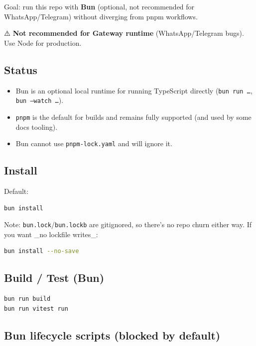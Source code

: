 Goal: run this repo with \textbf{Bun} (optional, not recommended for WhatsApp/Telegram)
without diverging from pnpm workflows.

⚠️ \textbf{Not recommended for Gateway runtime} (WhatsApp/Telegram bugs). Use Node for production.

\subsection{Status}


\begin{itemize}
  \item Bun is an optional local runtime for running TypeScript directly (\texttt{bun run …}, \texttt{bun --watch …}).
  \item \texttt{pnpm} is the default for builds and remains fully supported (and used by some docs tooling).
  \item Bun cannot use \texttt{pnpm-lock.yaml} and will ignore it.
\end{itemize}


\subsection{Install}


Default:

\begin{lstlisting}[language=bash]
bun install
\end{lstlisting}


Note: \texttt{bun.lock}/\texttt{bun.lockb} are gitignored, so there’s no repo churn either way. If you want \_no lockfile writes\_:

\begin{lstlisting}[language=bash]
bun install --no-save
\end{lstlisting}


\subsection{Build / Test (Bun)}


\begin{lstlisting}[language=bash]
bun run build
bun run vitest run
\end{lstlisting}


\subsection{Bun lifecycle scripts (blocked by default)}


